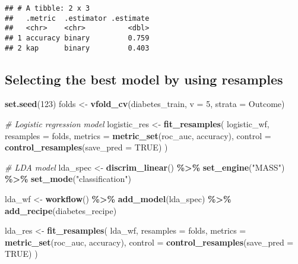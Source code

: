 \documentclass[
]{article}
\newenvironment{Shaded}{\begin{snugshade}}{\end{snugshade}}
\newcommand{\AttributeTok}[1]{\textcolor[rgb]{0.13,0.29,0.53}{#1}}
\newcommand{\CommentTok}[1]{\textcolor[rgb]{0.56,0.35,0.01}{\textit{#1}}}
\newcommand{\ConstantTok}[1]{\textcolor[rgb]{0.56,0.35,0.01}{#1}}
\newcommand{\DecValTok}[1]{\textcolor[rgb]{0.00,0.00,0.81}{#1}}
\newcommand{\FunctionTok}[1]{\textcolor[rgb]{0.13,0.29,0.53}{\textbf{#1}}}
\newcommand{\NormalTok}[1]{#1}
\newcommand{\OtherTok}[1]{\textcolor[rgb]{0.56,0.35,0.01}{#1}}
\newcommand{\SpecialCharTok}[1]{\textcolor[rgb]{0.81,0.36,0.00}{\textbf{#1}}}
\newcommand{\StringTok}[1]{\textcolor[rgb]{0.31,0.60,0.02}{#1}}
\begin{document}
\begin{verbatim}
## # A tibble: 2 x 3
##   .metric  .estimator .estimate
##   <chr>    <chr>          <dbl>
## 1 accuracy binary         0.759
## 2 kap      binary         0.403
\end{verbatim}

\subsection{Selecting the best model by using
resamples}\label{selecting-the-best-model-by-using-resamples}

\begin{Shaded}
\begin{Highlighting}[]
\FunctionTok{set.seed}\NormalTok{(}\DecValTok{123}\NormalTok{)}
\NormalTok{folds }\OtherTok{\textless{}{-}} \FunctionTok{vfold\_cv}\NormalTok{(diabetes\_train, }\AttributeTok{v =} \DecValTok{5}\NormalTok{, }\AttributeTok{strata =}\NormalTok{ Outcome)}

\CommentTok{\# Logistic regression model}
\NormalTok{logistic\_res }\OtherTok{\textless{}{-}} \FunctionTok{fit\_resamples}\NormalTok{(}
\NormalTok{  logistic\_wf,}
  \AttributeTok{resamples =}\NormalTok{ folds,}
  \AttributeTok{metrics =} \FunctionTok{metric\_set}\NormalTok{(roc\_auc, accuracy),}
  \AttributeTok{control =} \FunctionTok{control\_resamples}\NormalTok{(}\AttributeTok{save\_pred =} \ConstantTok{TRUE}\NormalTok{)}
\NormalTok{)}

\CommentTok{\# LDA model}
\NormalTok{lda\_spec }\OtherTok{\textless{}{-}} \FunctionTok{discrim\_linear}\NormalTok{() }\SpecialCharTok{\%\textgreater{}\%} 
  \FunctionTok{set\_engine}\NormalTok{(}\StringTok{"MASS"}\NormalTok{) }\SpecialCharTok{\%\textgreater{}\%} 
  \FunctionTok{set\_mode}\NormalTok{(}\StringTok{"classification"}\NormalTok{)}

\NormalTok{lda\_wf }\OtherTok{\textless{}{-}} \FunctionTok{workflow}\NormalTok{() }\SpecialCharTok{\%\textgreater{}\%} 
  \FunctionTok{add\_model}\NormalTok{(lda\_spec) }\SpecialCharTok{\%\textgreater{}\%} 
  \FunctionTok{add\_recipe}\NormalTok{(diabetes\_recipe)}

\NormalTok{lda\_res }\OtherTok{\textless{}{-}} \FunctionTok{fit\_resamples}\NormalTok{(}
\NormalTok{  lda\_wf,}
  \AttributeTok{resamples =}\NormalTok{ folds,}
  \AttributeTok{metrics =} \FunctionTok{metric\_set}\NormalTok{(roc\_auc, accuracy),}
  \AttributeTok{control =} \FunctionTok{control\_resamples}\NormalTok{(}\AttributeTok{save\_pred =} \ConstantTok{TRUE}\NormalTok{)}
\NormalTok{)}


\end{Highlighting}
\end{Shaded}
\end{document}
